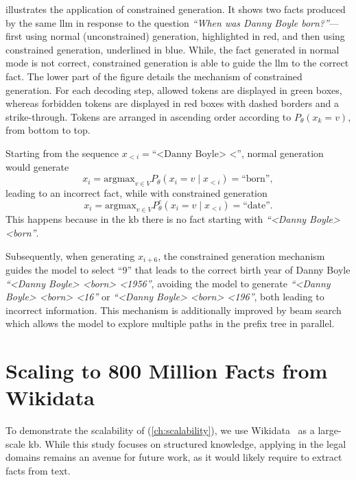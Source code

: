 illustrates the application of constrained generation. It shows two facts produced by the same \ac{llm} in response to the question \textit{``When was Danny Boyle born?''}---first using normal (unconstrained) generation, highlighted in red, and then using constrained generation, underlined in blue.
While, the fact generated in normal mode is not correct, constrained generation is able to guide the \ac{llm} to the correct fact. The lower part of the figure details the mechanism of constrained generation. For each decoding step, allowed tokens are displayed in green boxes, whereas forbidden tokens are displayed in red boxes with dashed borders and a strike-through.
Tokens are arranged in ascending order according to $P_\theta(x_k = v)$, from bottom to top.

Starting from the sequence 
$x_{<i} = \text{``<Danny Boyle> <''}$, normal generation would generate
\begin{equation}
    x_i = \text{argmax}_{v \in V}P_\theta(x_i = v \mid x_{<i}) = \text{``born''},
\end{equation}
leading to an incorrect fact, while with constrained generation
\begin{equation}
    x_i = \text{argmax}_{v \in V}P^c_\theta(x_i = v \mid x_{<i}) = \text{``date''}.
\end{equation}
%
This happens because in the \ac{kb} there is no fact starting with \textit{``<Danny Boyle> <born''}.

Subsequently, when generating $x_{i+6}$, the constrained generation mechanism guides the model to select ``9'' that leads to the correct birth year of Danny Boyle \textit{``<Danny Boyle> <born> <1956''}, avoiding the model to generate \textit{``<Danny Boyle> <born> <16''} or \textit{``<Danny Boyle> <born> <196''}, both leading to incorrect information.
This mechanism is additionally improved by beam search~\cite{hu-etal-2015-improved} which allows the model to explore multiple paths in the prefix tree in parallel.
% 

\section[Scaling to 800 Million Facts from Wikidata][Scaling to 800M Facts]{Scaling to 800 Million Facts from Wikidata}
\label{sec:wikidata-repr}

To demonstrate the scalability of  (\ref{ch:scalability}), we use Wikidata~\cite{wikidata} as a large-scale \ac{kb}. While this study focuses on structured knowledge, applying  in the legal domains remains an avenue for future work, as it would likely require to extract facts from text.

